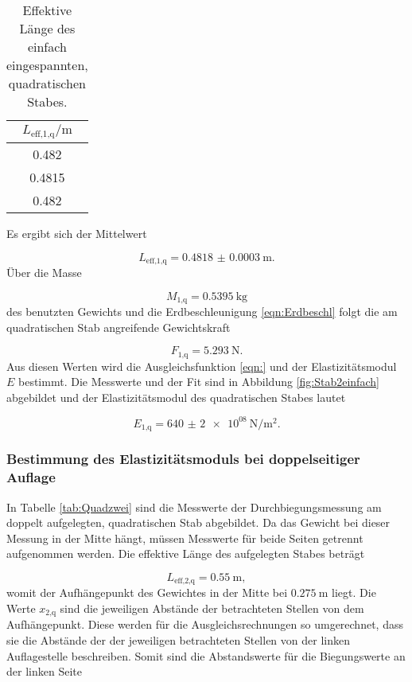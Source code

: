 \begin{table}[H]
  \centering
  \caption{Effektive Länge des einfach eingespannten, quadratischen Stabes.}
  \label{tab:Quadeinleff}
  \begin{tabular}{c}
    \toprule
    $L_\text{eff,1,q}/\si{\meter}$ \\
    \midrule
    0.482 \\
    0.4815 \\
    0.482 \\
    \bottomrule
  \end{tabular}
\end{table}

Es ergibt sich der Mittelwert

\begin{equation}
  L_\text{eff,1,q} = \SI{0.4818(3)}{\meter}.
\end{equation}
Über die Masse

\begin{equation}
  M_\text{1,q} =  \SI{0.5395}{\kilo\gram}
\end{equation}
des benutzten Gewichts
und die Erdbeschleunigung \eqref{eqn:Erdbeschl}
folgt die am quadratischen Stab angreifende Gewichtskraft

\begin{equation}
  F_\text{1,q} = \SI{5.293}{\newton}.
\end{equation}
Aus diesen Werten wird die Ausgleichsfunktion \eqref{eqn:} und der
Elastizitätsmodul $E$ bestimmt. Die Messwerte und der Fit sind in Abbildung
\ref{fig:Stab2einfach} abgebildet und der Elastizitätsmodul des quadratischen
Stabes lautet

\begin{equation}
  E_\text{1,q} = \SI{640(2)e08}{\newton\per\meter\squared}.
\end{equation}

\subsubsection{Bestimmung des Elastizitätsmoduls bei doppelseitiger Auflage}

In Tabelle \ref{tab:Quadzwei} sind die Messwerte der Durchbiegungsmessung am
doppelt aufgelegten, quadratischen Stab abgebildet. Da das Gewicht bei dieser
Messung in der Mitte hängt, müssen Messwerte für beide Seiten getrennt
aufgenommen werden. Die effektive Länge des aufgelegten Stabes beträgt

\begin{equation}
  L_\text{eff,2,q} = \SI{0.55}{\meter},
\end{equation}
womit der Aufhängepunkt des Gewichtes in der Mitte bei $\SI{0.275}{\meter}$
liegt. Die Werte $x_\text{2,q}$ sind die jeweiligen Abstände der
betrachteten Stellen von dem Aufhängepunkt. Diese werden
für die Ausgleichsrechnungen so umgerechnet, dass sie die Abstände der
der jeweiligen betrachteten Stellen von der linken Auflagestelle beschreiben.
Somit sind die Abstandswerte für die Biegungswerte an der linken Seite

